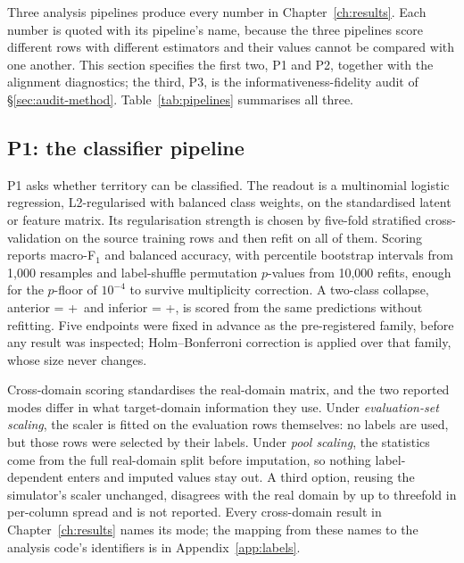 Three analysis pipelines produce every number in Chapter~\ref{ch:results}. Each number is quoted with its pipeline's name, because the three pipelines score different rows with different estimators and their values cannot be compared with one another. This section specifies the first two, P1 and P2, together with the alignment diagnostics; the third, P3, is the informativeness-fidelity audit of \S\ref{sec:audit-method}. Table~\ref{tab:pipelines} summarises all three.

\subsection{P1: the classifier pipeline}
\label{sec:p1}
P1 asks whether territory can be classified. The readout is a multinomial logistic regression, L2-regularised with balanced class weights, on the standardised latent or feature matrix. Its regularisation strength is chosen by five-fold stratified cross-validation on the source training rows and then refit on all of them. Scoring reports macro-F$_1$ and balanced accuracy, with percentile bootstrap intervals from 1,000 resamples and label-shuffle permutation $p$-values from 10,000 refits, enough for the $p$-floor of $10^{-4}$ to survive multiplicity correction. A two-class collapse, anterior = \AS+\AL\ and inferior = \INF+\IL, is scored from the same predictions without refitting. Five endpoints were fixed in advance as the pre-registered family, before any result was inspected; Holm--Bonferroni correction is applied over that family, whose size never changes. 

Cross-domain scoring standardises the real-domain matrix, and the two reported modes differ in what target-domain information they use. Under \emph{evaluation-set scaling}, the scaler is fitted on the evaluation rows themselves: no labels are used, but those rows were selected by their labels. Under \emph{pool scaling}, the statistics come from the full real-domain split before imputation, so nothing label-dependent enters and imputed values stay out. A third option, reusing the simulator's scaler unchanged, disagrees with the real domain by up to threefold in per-column spread and is not reported. Every cross-domain result in Chapter~\ref{ch:results} names its mode; the mapping from these names to the analysis code's identifiers is in Appendix~\ref{app:labels}. 

